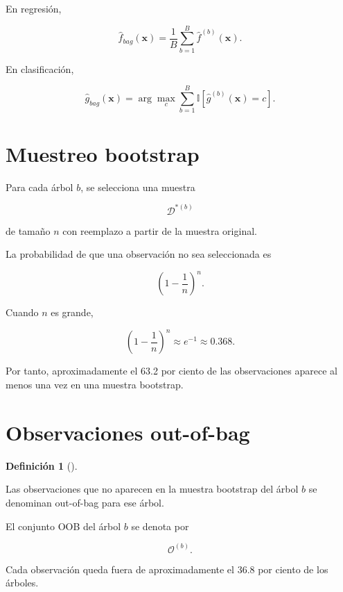 \documentclass[
  spanish,
  10.5pt,
  letterpaper,
  DIV=11,
  numbers=noendperiod,
  oneside,
  open=any]{scrreprt}
\theoremstyle{definition}
\newtheorem{definition}{Definición}[chapter]
\theoremstyle{definition}
\theoremstyle{plain}
\theoremstyle{remark}
\begin{document}
En regresión,

\[
\widehat{f}_{bag}(\mathbf{x})
=
\frac{1}{B}\sum_{b=1}^{B}\widehat{f}^{(b)}(\mathbf{x}).
\]

En clasificación,

\[
\widehat{g}_{bag}(\mathbf{x})
=
\arg\max_c
\sum_{b=1}^{B}
\mathbb{I}
\left[
\widehat{g}^{(b)}(\mathbf{x})=c
\right].
\]

\section*{Muestreo bootstrap}\label{muestreo-bootstrap}


Para cada árbol \(b\), se selecciona una muestra

\[
\mathcal{D}^{*(b)}
\]

de tamaño \(n\) con reemplazo a partir de la muestra original.

La probabilidad de que una observación no sea seleccionada es

\[
\left(1-\frac{1}{n}\right)^n.
\]

Cuando \(n\) es grande,

\[
\left(1-\frac{1}{n}\right)^n
\approx e^{-1}\approx0.368.
\]

Por tanto, aproximadamente el 63.2 por ciento de las observaciones
aparece al menos una vez en una muestra bootstrap.

\section*{Observaciones out-of-bag}\label{observaciones-out-of-bag}


\begin{definition}[]\protect\hypertarget{def-oob}{}\label{def-oob}

Las observaciones que no aparecen en la muestra bootstrap del árbol
\(b\) se denominan out-of-bag para ese árbol.

\end{definition}

El conjunto OOB del árbol \(b\) se denota por

\[
\mathcal{O}^{(b)}.
\]

Cada observación queda fuera de aproximadamente el 36.8 por ciento de
los árboles.
\end{document}
